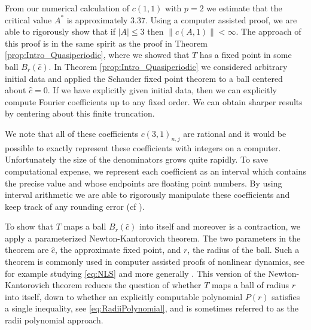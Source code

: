\documentclass{article}
\begin{document}
  From our numerical calculation of $c(1,1)$ with $p=2$ we estimate that the critical value $A^*$ is approximately $3.37$.  
  Using a computer assisted proof, we are able to rigorously show that if $|A | \leq 3$ then $ \| c(A,1) \| < \infty$. 
  The approach of this proof is in the same spirit as the proof in  Theorem \ref{prop:Intro_Quasiperiodic}, where we showed that $T$ has a fixed point in some ball $B_r(\hat{c})$.  
In Theorem \ref{prop:Intro_Quasiperiodic} we considered arbitrary initial data and applied the Schauder fixed point theorem to a  ball centered about $ \hat{c} =0$.
If we have explicitly given initial data, then we can explicitly compute Fourier coefficients up to any fixed order.  We can obtain sharper results by centering about this finite truncation. 



  We note that all of these coefficients $c(3,1)_{n,j}$ are rational and it would be possible to exactly represent these coefficients with integers on a computer. Unfortunately the size of the denominators grows quite rapidly. To save computational expense, we represent each coefficient as an interval which contains the precise value and whose endpoints are floating point numbers. By using interval arithmetic we are able to rigorously manipulate these coefficients and keep track of any rounding error (cf \cite{gomez2019computer}). 
  
  
  
  To show that $T$ maps a ball $B_r(\hat{c})$ into itself and moreover is a contraction, we apply a  parameterized Newton-Kantorovich theorem. 
  The two parameters in the theorem are $\hat{c}$, the approximate fixed point,   and $r$,  the radius of the ball.   
  Such a theorem is commonly used in computer assisted proofs of nonlinear dynamics, see for example  \cite{jaquette2020global} studying \eqref{eq:NLS} and more generally \cite{van2015rigorous,james2017validated,gomez2019computer}. 
  This version of the Newton-Kantorovich theorem reduces the question of whether $T$ maps a ball of radius $r$ into itself, down to whether an explicitly computable polynomial $P(r)$ satisfies a single inequality, see   \eqref{eq:RadiiPolynomial}, and is sometimes referred to as the radii polynomial approach.
  
  
  
\end{document}
